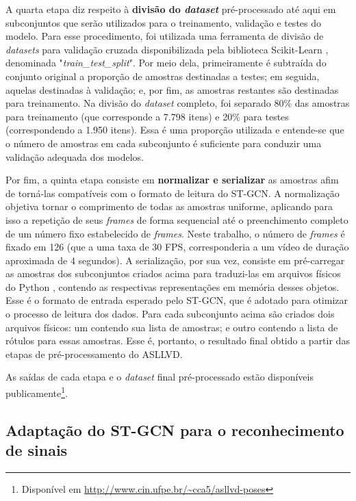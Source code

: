 A quarta etapa diz respeito à \textbf{divisão do \textit{dataset}} pré-processado até aqui em subconjuntos que serão utilizados para o treinamento, validação e testes do modelo. Para esse procedimento, foi utilizada uma ferramenta de divisão de \textit{datasets} para validação cruzada disponibilizada pela biblioteca Scikit-Learn \cite{scikit-learn}, denominada "\textit{train\_test\_split}". Por meio dela, primeiramente é subtraída do conjunto original a proporção de amostras destinadas a testes; em seguida, aquelas destinadas à validação; e, por fim, as amostras restantes são destinadas para treinamento. Na divisão do \textit{dataset} completo, foi separado 80\% das amostras para treinamento (que corresponde a 7.798 itens) e 20\% para testes (correspondendo a 1.950 itens). Essa é uma proporção utilizada e entende-se que o número de amostras em cada subconjunto é suficiente para conduzir uma validação adequada dos modelos.

Por fim, a quinta etapa consiste em \textbf{normalizar e serializar} as amostras afim de torná-las compatíveis com o formato de leitura do ST-GCN. A normalização objetiva tornar o comprimento de todas as amostras uniforme, aplicando para isso a repetição de seus \textit{frames} de forma sequencial até o preenchimento completo de um número fixo estabelecido de \textit{frames}. Neste trabalho, o número de \textit{frames} é fixado em 126 (que a uma taxa de 30 FPS, corresponderia a um vídeo de duração aproximada de 4 segundos). A serialização, por sua vez, consiste em pré-carregar as amostras dos subconjuntos criados acima para traduzi-las em arquivos físicos do Python \cite{python}, contendo as respectivas representações em memória desses objetos. Esse é o formato de entrada esperado pelo ST-GCN, que é adotado para otimizar o processo de leitura dos dados. Para cada subconjunto acima são criados dois arquivos físicos: um contendo sua lista de amostras; e outro contendo a lista de rótulos para essas amostras. Esse é, portanto, o resultado final obtido a partir das etapas de pré-processamento do ASLLVD.

As saídas de cada etapa e o \textit{dataset} final pré-processado estão disponíveis publicamente\footnote{
    Disponível em \url{http://www.cin.ufpe.br/~cca5/asllvd-poses}
}.


\subsection{Adaptação do ST-GCN para o reconhecimento de sinais} %
\label{sec:adaptacao-st-gcn}

